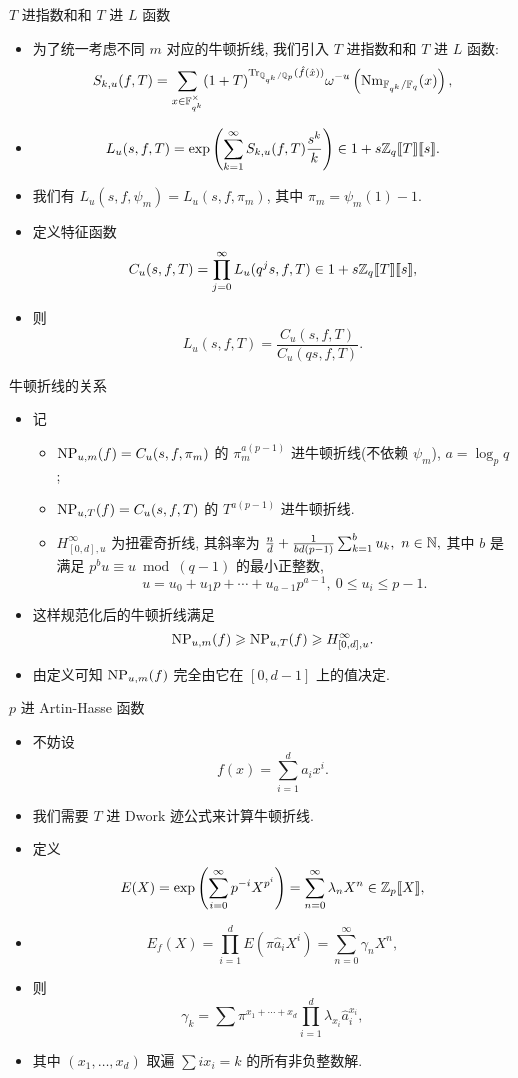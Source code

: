 \documentclass[aspectratio=169,handout]{ctexbeamer}
\newcommand\ldb{\llbracket}
\newcommand\rdb{\rrbracket}
\begin{document}
\begin{frame}{$T$ 进指数和和 $T$ 进 $L$ 函数}
	\begin{itemize}
		\item 为了统一考虑不同 $m$ 对应的牛顿折线, 我们引入 $T$ 进指数和和 $T$ 进 $L$ 函数:
		\[
			S_{k,u}(f,T)=\sum_{x\in{\mathbb{F}}_{q^k}^\times}(1+T)^{{\mathrm{Tr}}_{{\mathbb{Q}}_{q^k}/{\mathbb{Q}}_p}(\hat f(\hat x))}\omega^{-u}\left({\mathrm{Nm}}_{{\mathbb{F}}_{q^k}/{\mathbb{F}}_q}(x)\right), 
		\]
		\item 
		\[
			L_u(s,f,T)=\exp\left(\sum_{k=1}^\infty S_{k,u}(f,T)\frac{s^k}{k}\right)\in 1+s\BZ_q\ldb T\rdb\ldb s\rdb.
		\]
		\item 我们有 $L_u(s,f,\psi_m)=L_u(s,f,\pi_m)$, 其中 $\pi_m=\psi_m(1)-1$.
		\item 定义特征函数
		\[
			C_u(s,f,T)=\prod_{j=0}^\infty L_u(q^j s,f,T)\in 1+s\BZ_q\ldb T\rdb\ldb s\rdb,
		\]
		\item 则
		\[
			L_u(s,f,T)=\frac{C_u(s,f,T)}{C_u(qs,f,T)}.
		\]
	\end{itemize}
\end{frame}


\begin{frame}{牛顿折线的关系}
	\begin{itemize}
		\item 记
		\begin{itemize}
			\item ${\mathrm{NP}}_{u,m}(f)=C_u(s,f,\pi_m)$ 的 $\pi_m^{a(p-1)}$ 进牛顿折线(不依赖 $\psi_m$), $a=\log_p q$;
			\item ${\mathrm{NP}}_{u,T}(f)=C_u(s,f,T)$ 的 $T^{a(p-1)}$ 进牛顿折线.
			\item $H_{[0,d],u}^\infty$ 为扭霍奇折线, 其斜率为 $\tfrac{n}{d}+\tfrac{1}{bd(p-1)}\sum_{k=1}^b u_k,\ n\in\BN,$
			其中 $b$ 是满足 $p^bu\equiv u\bmod{(q-1)}$ 的最小正整数,
			\[
				u=u_0+u_1p+\cdots+u_{a-1}p^{a-1},\ 0\le u_i\le p-1.
			\]
		\end{itemize}
		\item 这样规范化后的牛顿折线满足
		\[
			{\mathrm{NP}}_{u,m}(f)\geqslant {\mathrm{NP}}_{u,T}(f)\geqslant H_{[0,d],u}^\infty.
		\]
		\item 由定义可知 ${\mathrm{NP}}_{u,m}(f)$ 完全由它在 $[0,d-1]$ 上的值决定.
	\end{itemize}
\end{frame}


\begin{frame}{$p$ 进 Artin-Hasse 函数}
	\beqskip{0pt}
	\begin{itemize}
		\item 不妨设
		\[
			f(x)=\sum_{i=1}^d a_ix^i.
		\]
		\item 我们需要 $T$ 进 Dwork 迹公式来计算牛顿折线.
		\item 定义
		\[
			E(X)=\exp\left(\sum_{i=0}^\infty p^{-i}X^{p^i}\right)=\sum_{n=0}^\infty \lambda_n X^n\in\BZ_p\ldb X\rdb,
		\]
		\item 
		\[
			E_f(X)=\prod_{i=1}^d E(\pi \hat a_i X^i)=\sum_{n=0}^\infty \gamma_n X^n,
		\]
		\item 则
		\[
			\gamma_k=\sum\pi^{x_1+\cdots+x_d}\prod_{i=1}^d\lambda_{x_i}\hat a_i^{x_i},
		\]
		\item 其中 $(x_1,\dots,x_d)$ 取遍 $\sum i x_i=k$ 的所有非负整数解.
	\end{itemize}
	\endgroup
\end{frame}
\end{document}
